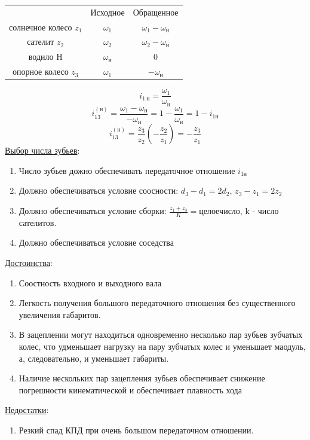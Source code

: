 \documentclass{article}
\begin{document}
\begin{tabular}{ccc}
	& Исходное & Обращенное\\
	солнечное колесо $z_1$ & $\omega_1$ & $\omega_1 - \omega_н$\\
	сателит $z_2$ & $\omega_2$ & $\omega_2 - \omega_н$\\
	водило H & $\omega_н$ & 0\\
	опорное колесо $z_3$ & $\omega_1$ & $- \omega_н$\\
\end{tabular}
$$
i_{1\:н} = \frac{\omega_1}{\omega_н}
$$
$$
i_{13}^{(н)} = \frac{\omega_1 - \omega_н}{- \omega_н}  = 1 - \frac{\omega_1}{\omega_н} = 1 - i_{1н}
$$
$$
i_{13}^{(н)} = \frac{z_3}{z_2} \left(- \frac{z_2}{z_1} \right) = - \frac{z_3}{z_1}
$$
\underline{Выбор числа зубьев}:
\begin{enumerate}
	\item Число зубьев дожно обеспечивать передаточное отношение $i_{1н}$
	\item Должно обеспечиваться условие соосности: $d_3 - d_1 = 2 d_2$, $z_3 - z_1 = 2 z_2$
	\item Должно обеспечиваться условие сборки: $\frac{z_1 + z_3}{K} = целое число$, k - число сателитов.
	\item Должно обеспечиваться условие соседства
\end{enumerate}
\underline{Достоинства}:
\begin{enumerate}
	\item Соостность входного и выходного вала
	\item Легкость получения большого передаточного отношения без существенного увеличения габаритов.
	\item В зацеплении могут находиться одновременно несколько пар зубьев зубчатых колес, что удменьшает нагрузку на пару зубчатых колес и уменьшает маодуль, а, следовательно, и уменьшает габариты.
	\item Наличие нескольких пар зацепления зубьев обеспечивает снижение погрешности кинематической и обеспечивает плавность хода
\end{enumerate}
\underline{Недостатки}:
\begin{enumerate}
	\item Резкий спад КПД при очень большом передаточном отношении.
\end{enumerate}
\end{document}
